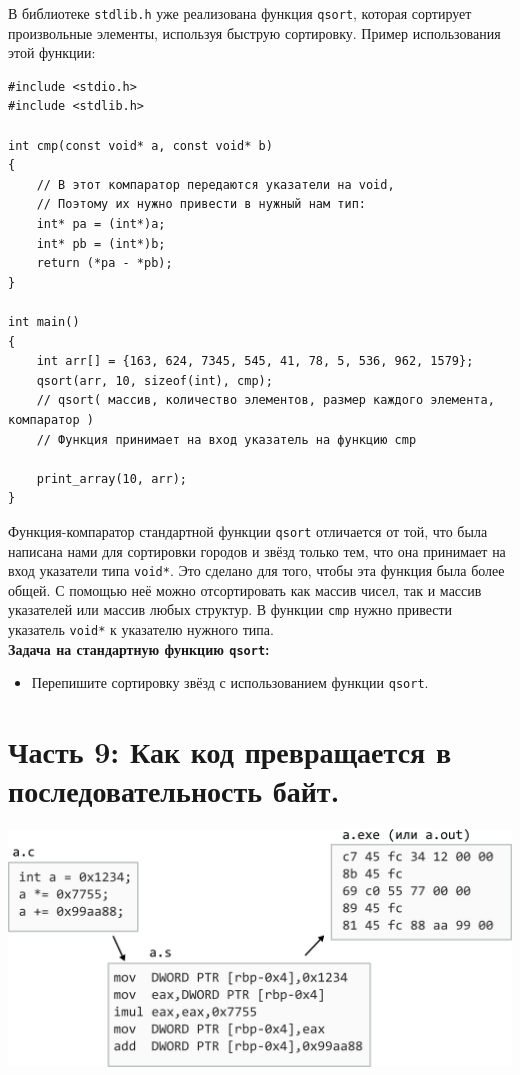 \documentclass{article}
\begin{document}
В библиотеке \texttt{stdlib.h} уже реализована функция \texttt{qsort}, которая сортирует произвольные элементы, используя быструю сортировку. Пример использования этой функции:
\begin{lstlisting}
#include <stdio.h>
#include <stdlib.h>

int cmp(const void* a, const void* b)
{
    // В этот компаратор передаются указатели на void,
    // Поэтому их нужно привести в нужный нам тип:
    int* pa = (int*)a;
    int* pb = (int*)b;
    return (*pa - *pb);
}

int main()
{
    int arr[] = {163, 624, 7345, 545, 41, 78, 5, 536, 962, 1579};
    qsort(arr, 10, sizeof(int), cmp);
    // qsort( массив, количество элементов, размер каждого элемента, компаратор )
    // Функция принимает на вход указатель на функцию cmp
   
    print_array(10, arr);
}
\end{lstlisting}
Функция-компаратор стандартной функции \texttt{qsort} отличается от той, что была написана нами для сортировки
городов и звёзд только тем, что она принимает на вход указатели типа \texttt{void*}. Это сделано для того, чтобы эта функция была более общей. С помощью неё можно отсортировать как массив чисел, так и массив указателей или массив любых структур. В функции \texttt{cmp} нужно привести указатель \texttt{void*} к указателю нужного типа.\\
\textbf{Задача на стандартную функцию \texttt{qsort}:}
\begin{itemize}
\item Перепишите сортировку звёзд с использованием функции \texttt{qsort}.
\end{itemize}



\newpage
\section*{Часть 9: Как код превращается в последовательность байт.}
\begin{center}
\includegraphics[scale=0.9]{../images/code_to_hex.png}
\end{center}
\end{document}
